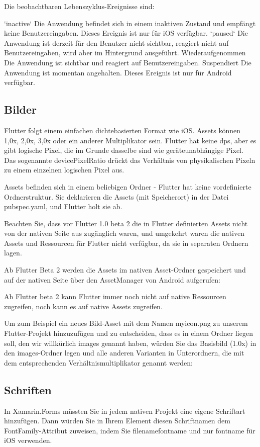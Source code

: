 Die beobachtbaren Lebenszyklus-Ereignisse sind:

`inactive`
Die Anwendung befindet sich in einem inaktiven Zustand und empfängt keine Benutzereingaben. Dieses Ereignis ist nur für iOS verfügbar.
`paused`
Die Anwendung ist derzeit für den Benutzer nicht sichtbar, reagiert nicht auf Benutzereingaben, wird aber im Hintergrund ausgeführt.
Wiederaufgenommen
Die Anwendung ist sichtbar und reagiert auf Benutzereingaben.
Suspendiert
Die Anwendung ist momentan angehalten. Dieses Ereignis ist nur für Android verfügbar.
\subsection{Bilder}
Flutter folgt einem einfachen dichtebasierten Format wie iOS. Assets können 1,0x, 2,0x, 3,0x oder ein anderer Multiplikator sein. Flutter hat keine dps, aber es gibt logische Pixel, die im Grunde dasselbe sind wie geräteunabhängige Pixel. Das sogenannte devicePixelRatio drückt das Verhältnis von physikalischen Pixeln zu einem einzelnen logischen Pixel aus.

Assets befinden sich in einem beliebigen Ordner - Flutter hat keine vordefinierte Ordnerstruktur. Sie deklarieren die Assets (mit Speicherort) in der Datei pubspec.yaml, und Flutter holt sie ab.

Beachten Sie, dass vor Flutter 1.0 beta 2 die in Flutter definierten Assets nicht von der nativen Seite aus zugänglich waren, und umgekehrt waren die nativen Assets und Ressourcen für Flutter nicht verfügbar, da sie in separaten Ordnern lagen.

Ab Flutter Beta 2 werden die Assets im nativen Asset-Ordner gespeichert und auf der nativen Seite über den AssetManager von Android aufgerufen:

Ab Flutter beta 2 kann Flutter immer noch nicht auf native Ressourcen zugreifen, noch kann es auf native Assets zugreifen.

Um zum Beispiel ein neues Bild-Asset mit dem Namen myicon.png zu unserem Flutter-Projekt hinzuzufügen und zu entscheiden, dass es in einem Ordner liegen soll, den wir willkürlich images genannt haben, würden Sie das Basisbild (1.0x) in den images-Ordner legen und alle anderen Varianten in Unterordnern, die mit dem entsprechenden Verhältnismultiplikator genannt werden:
\subsection{Schriften}
In Xamarin.Forms müssten Sie in jedem nativen Projekt eine eigene Schriftart hinzufügen. Dann würden Sie in Ihrem Element diesen Schriftnamen dem FontFamily-Attribut zuweisen, indem Sie filenamefontname und nur fontname für iOS verwenden.

